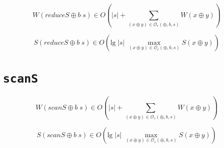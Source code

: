 \documentclass[a4paper,10pt]{article}
\begin{document}
\begin{equation*}
    W \left( reduceS \oplus b \; s \right) \in
    O \left( \vert s \vert + \sum_{(x \oplus y) \in \mathcal{O}_r(\oplus,b,s)} W(x \oplus y) \right)
\end{equation*}

\begin{equation*}
    S \left( reduceS \oplus b \; s \right) \in
    O \left( \text{lg} \; \vert s \vert \; \max_{(x \oplus y) \in \mathcal{O}_r(\oplus,b,s)} S(x \oplus y) \right)
\end{equation*}

\section*{\texttt{scanS}}

\begin{equation*}
    W \left( scanS \oplus b \; s \right) \in
    O \left( \vert s \vert + \sum_{(x \oplus y) \in \mathcal{O}_s(\oplus,b,s)} W(x \oplus y) \right)
\end{equation*}

\begin{equation*}
    S \left( scanS \oplus b \; s \right) \in
    O \left( \text{lg} \; \vert s \vert \; \max_{(x \oplus y) \in \mathcal{O}_s(\oplus,b,s)} S(x \oplus y) \right)
\end{equation*}
\end{document}
